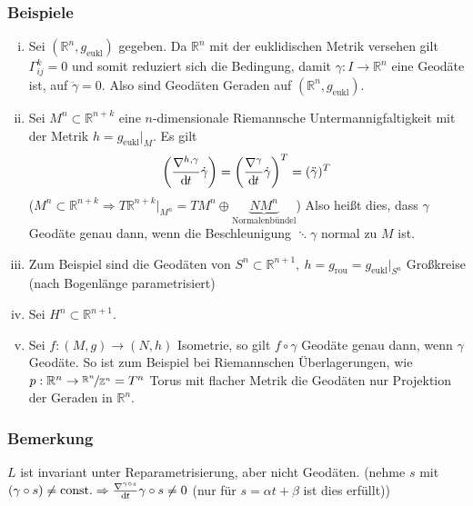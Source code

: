 \subsubsection{Beispiele}
\label{ssub:240}
\begin{enumerate}[(i)]
\item Sei $(\mathds{R}^n,g_{\text{eukl}})$ gegeben. Da $\mathds{R}^n$ mit der euklidischen Metrik versehen gilt $\Gamma_{ij}^k = 0$ und somit reduziert sich die Bedingung, damit $\gamma:I\to \mathds{R}^n$ eine Geodäte ist, auf $\ddot{\gamma} = 0$. Also sind Geodäten Geraden auf $(\mathds{R}^n,g_{\text{eukl}})$.
\item Sei $M^n\subset \mathds{R}^{n+k}$ eine $n$-dimensionale Riemannsche Untermannigfaltigkeit mit der Metrik $h = g_{\text{eukl}}\vert_M$. Es gilt 
\[
\enbrace*{\frac{\nabla^{h, \gamma}}{\mathd t} \dot{\gamma}} = \enbrace*{\frac{\nabla^\gamma}{\mathd t} \dot{\gamma}}^T = (\ddot{\gamma})^T
\]
($M^n\subset \mathds{R}^{n+k} \Rightarrow T\mathds{R}^{n+k}\vert_{M^n} = TM^n \oplus \underbrace{NM^n}_{\text{Normalenbündel}}$)
Also heißt dies, dass $\gamma$ Geodäte genau dann, wenn die Beschleunigung $\ddots{\gamma}$ normal zu $M$ ist.
\item Zum Beispiel sind die Geodäten von $S^n\subset \mathds{R}^{n+1},\ h= g_{\text{rou}} = g_{\text{eukl}}\vert_{S^n}$ Großkreise (nach Bogenlänge parametrisiert)
\item Sei $H^n\subset \mathds{R}^{n+1}$.
\item Sei $f:(M,g)\to (N,h)$ Isometrie, so gilt $f\circ \gamma$ Geodäte genau dann, wenn $\gamma$ Geodäte. So ist zum Beispiel bei Riemannschen Überlagerungen, wie $p:\mathds{R}^n \to \nicefrac{\mathds{R}^n}{\mathds{Z}^n} = T^n$ Torus mit flacher Metrik die Geodäten nur Projektion der Geraden in $\mathds{R}^n$.
\end{enumerate}

\subsubsection{Bemerkung}
\label{ssub:241}
$L$ ist invariant unter Reparametrisierung, aber nicht Geodäten. (nehme $s$ mit $(\gamma \circ s) \neq \text{const.} \Rightarrow \frac{\nabla^{\gamma\circ s}}{\mathd t}\gamma\circ s \neq 0$ (nur für $s = \alpha t + \beta$ ist dies erfüllt))


